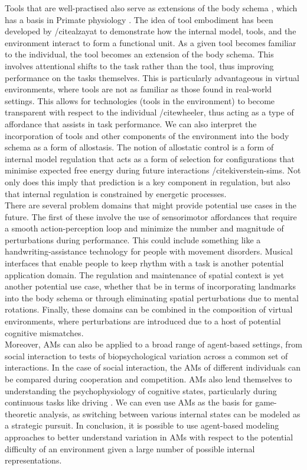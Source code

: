 \documentclass{sigchi}
\begin{document}
Tools that are well-practised also serve as extensions of the body schema \cite{bergstrom}, which has a basis in Primate physiology \cite{maravita-iriki}. The idea of tool embodiment has been developed by /cite{alzayat} to demonstrate how the internal model, tools, and the environment interact to form a functional unit. As a given tool becomes familiar to the individual, the tool becomes an extension of the body schema. This involves attentional shifts to the task rather than the tool, thus improving performance on the tasks themselves. This is particularly advantageous in virtual environments, where tools are not as familiar as those found in real-world settings. This allows for technologies (tools in the environment) to become transparent with respect to the individual /cite{wheeler}, thus acting as a type of affordance that assists in task performance. We can also interpret the incorporation of tools and other components of the environment into the body schema as a form of allostasis. The notion of allostatic control is a form of internal model regulation that acts as a form of selection for configurations that minimise expected free energy during future interactions /cite{kiverstein-sims}. Not only does this imply that prediction is a key component in regulation, but also that internal regulation is constrained by energetic processes.
\\
There are several problem domains that might provide potential use cases in the future. The first of these involve the use of sensorimotor affordances that require a smooth action-perception loop and minimize the number and magnitude of perturbations during performance. This could include something like a handwriting-assistance technology for people with movement disorders. Musical interfaces that enable people to keep rhythm with a task is another potential application domain. The regulation and maintenance of spatial context is yet another potential use case, whether that be in terms of incorporating landmarks into the body schema or through eliminating spatial perturbations due to mental rotations. Finally, these domains can be combined in the composition of virtual environments, where perturbations are introduced due to a host of potential cognitive mismatches.\\
Moreover, AMs can also be applied to a broad range of agent-based settings, from social interaction to tests of biopsychological variation across a common set of interactions. In the case of social interaction, the AMs of different individuals can be compared during cooperation and competition. AMs also lend themselves to understanding the psychophysiology of cognitive states, particularly during continuous tasks like driving \cite{lohani}. We can even use AMs as the basis for game-theoretic analysis, as switching between various internal states can be modeled as a strategic pursuit. In conclusion, it is possible to use agent-based modeling approaches to better understand variation in AMs with respect to the potential difficulty of an environment given a large number of possible internal representations.   
\end{document}
